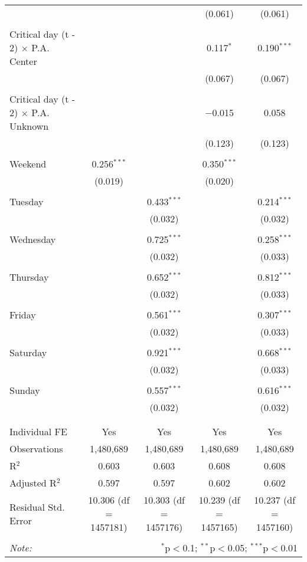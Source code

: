 \documentclass[
]{article}
\begin{document}
\begin{table}[!htbp]
{\begin{tabular}{@{\extracolsep{5pt}}lcccc}
  &  &  & (0.061) & (0.061) \\ 
  & & & & \\ 
 Critical day (t - 2) $\times$ P.A. Center &  &  & 0.117$^{*}$ & 0.190$^{***}$ \\ 
  &  &  & (0.067) & (0.067) \\ 
  & & & & \\ 
 Critical day (t - 2) $\times$ P.A. Unknown &  &  & $-$0.015 & 0.058 \\ 
  &  &  & (0.123) & (0.123) \\ 
  & & & & \\ 
 Weekend & 0.256$^{***}$ &  & 0.350$^{***}$ &  \\ 
  & (0.019) &  & (0.020) &  \\ 
  & & & & \\ 
 Tuesday &  & 0.433$^{***}$ &  & 0.214$^{***}$ \\ 
  &  & (0.032) &  & (0.032) \\ 
  & & & & \\ 
 Wednesday &  & 0.725$^{***}$ &  & 0.258$^{***}$ \\ 
  &  & (0.032) &  & (0.033) \\ 
  & & & & \\ 
 Thursday &  & 0.652$^{***}$ &  & 0.812$^{***}$ \\ 
  &  & (0.032) &  & (0.033) \\ 
  & & & & \\ 
 Friday &  & 0.561$^{***}$ &  & 0.307$^{***}$ \\ 
  &  & (0.032) &  & (0.033) \\ 
  & & & & \\ 
 Saturday &  & 0.921$^{***}$ &  & 0.668$^{***}$ \\ 
  &  & (0.032) &  & (0.033) \\ 
  & & & & \\ 
 Sunday &  & 0.557$^{***}$ &  & 0.616$^{***}$ \\ 
  &  & (0.032) &  & (0.032) \\ 
  & & & & \\ 
\hline \\[-1.8ex] 
Individual FE & Yes & Yes & Yes & Yes \\ 
Observations & 1,480,689 & 1,480,689 & 1,480,689 & 1,480,689 \\ 
R$^{2}$ & 0.603 & 0.603 & 0.608 & 0.608 \\ 
Adjusted R$^{2}$ & 0.597 & 0.597 & 0.602 & 0.602 \\ 
Residual Std. Error & 10.306 (df = 1457181) & 10.303 (df = 1457176) & 10.239 (df = 1457165) & 10.237 (df = 1457160) \\ 
\hline 
\hline \\[-1.8ex] 
\textit{Note:}  & \multicolumn{4}{r}{$^{*}$p$<$0.1; $^{**}$p$<$0.05; $^{***}$p$<$0.01} \\ 
\end{tabular}
} 
\end{table} 
\newpage
\end{document}
